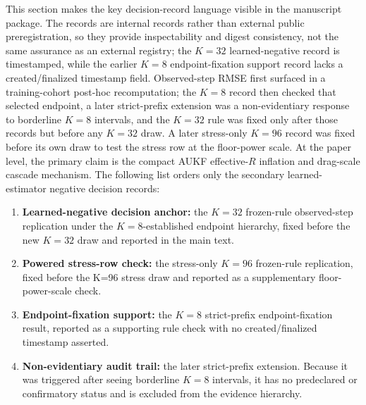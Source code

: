 \documentclass{article}
\begin{document}
This section makes the key decision-record language visible in the manuscript package. The records are internal records rather than external public preregistration, so they provide inspectability and digest consistency, not the same assurance as an external registry; the $K=32$ learned-negative record is timestamped, while the earlier $K=8$ endpoint-fixation support record lacks a created/finalized timestamp field. Observed-step RMSE first surfaced in a training-cohort post-hoc recomputation; the $K=8$ record then checked that selected endpoint, a later strict-prefix extension was a non-evidentiary response to borderline $K=8$ intervals, and the $K=32$ rule was fixed only after those records but before any $K=32$ draw. A later stress-only $K=96$ record was fixed before its own draw to test the stress row at the floor-power scale. At the paper level, the primary claim is the compact AUKF effective-$R$ inflation and drag-scale cascade mechanism. The following list orders only the secondary learned-estimator negative decision records:
\begin{enumerate}[leftmargin=*]
  \item \textbf{Learned-negative decision anchor:} the $K=32$ frozen-rule observed-step replication under the $K=8$-established endpoint hierarchy, fixed before the new $K=32$ draw and reported in the main text.
  \item \textbf{Powered stress-row check:} the stress-only $K=96$ frozen-rule replication, fixed before the K=96 stress draw and reported as a supplementary floor-power-scale check.
  \item \textbf{Endpoint-fixation support:} the $K=8$ strict-prefix endpoint-fixation result, reported as a supporting rule check with no created/finalized timestamp asserted.
  \item \textbf{Non-evidentiary audit trail:} the later strict-prefix extension. Because it was triggered after seeing borderline $K=8$ intervals, it has no predeclared or confirmatory status and is excluded from the evidence hierarchy.
\end{enumerate}
\end{document}

